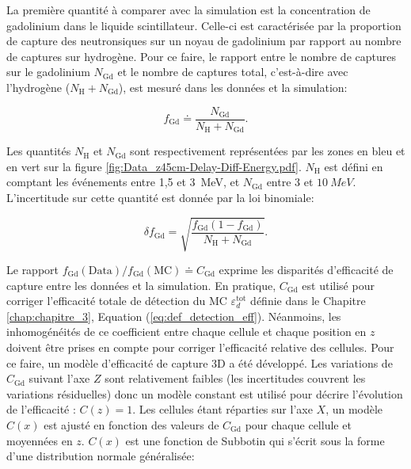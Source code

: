La première quantité à comparer avec la simulation est la concentration de gadolinium dans le liquide scintillateur. Celle-ci est caractérisée par la proportion de capture des neutronsiques sur un noyau de gadolinium par rapport au nombre de captures sur hydrogène. Pour ce faire, le rapport entre le nombre de captures sur le gadolinium $N_\textrm{Gd}$ et le nombre de captures total, c'est-à-dire avec l'hydrogène ($N_\textrm{H} + N_\textrm{Gd}$), est mesuré dans les données et la simulation:

\begin{equation}
    f_\textrm{Gd} \doteq \frac{N_\textrm{Gd}}{N_\textrm{H} + N_\textrm{Gd}}.
\end{equation}

\bigbreak

Les quantités $N_\textrm{H}$ et $N_\textrm{Gd}$ sont respectivement représentées par les zones en bleu et en vert sur la figure \ref{fig:Data_z45cm-Delay-Diff-Energy.pdf}. $N_\textrm{H}$ est défini en comptant les événements entre 1,5 et \SI{3}{MeV}, et $N_\textrm{Gd}$ entre 3 et $\SI{10}{MeV}$. L'incertitude sur cette quantité est donnée par la loi binomiale:

\begin{equation}
    \delta f_\textrm{Gd} = \sqrt{\frac{f_\textrm{Gd}(1-f_\textrm{Gd})}{N_\textrm{H} + N_\textrm{Gd}}}.
\end{equation}

\bigbreak

Le rapport $f_\textrm{Gd}(\textrm{Data})/f_\textrm{Gd}(\textrm{MC}) \doteq C_\textrm{Gd}$ exprime les disparités d'efficacité de capture entre les données et la simulation. En pratique, $C_\textrm{Gd}$ est utilisé pour corriger l'efficacité totale de détection du MC $\varepsilon_d^\textrm{tot}$ définie dans le Chapitre \ref{chap:chapitre_3}, Equation (\ref{eq:def_detection_eff}). Néanmoins, les inhomogénéités de ce coefficient entre chaque cellule et chaque position en $z$ doivent être prises en compte pour corriger l'efficacité relative des cellules. Pour ce faire, un modèle d'efficacité de capture 3D a été développé. Les variations de $C_\textrm{Gd}$ suivant l'axe $Z$ sont relativement faibles (les incertitudes couvrent les variations résiduelles) donc un modèle constant est utilisé pour décrire l'évolution de l'efficacité : $C(z) = 1$. Les cellules étant réparties sur l'axe $X$, un modèle $C(x)$ est ajusté en fonction des valeurs de $C_\textrm{Gd}$ pour chaque cellule et moyennées en $z$. $C(x)$ est une fonction de Subbotin  \cite{zbMATH02598645} qui s'écrit sous la forme d'une distribution normale généralisée:

